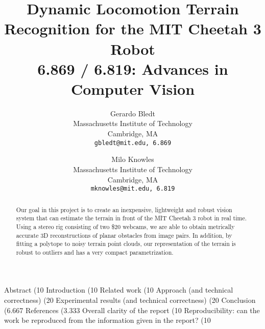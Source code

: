 \documentclass[10pt,twocolumn,letterpaper]{article}
\begin{document}
\title{Dynamic Locomotion Terrain Recognition for the MIT Cheetah 3 Robot \\ 6.869 / 6.819: Advances in Computer Vision}

\author{Gerardo Bledt\\
Massachusetts Institute of Technology\\
Cambridge, MA\\
{\tt\small gbledt@mit.edu, 6.869}
\and
Milo Knowles\\
Massachusetts Institute of Technology\\
Cambridge, MA\\
{\tt\small mknowles@mit.edu, 6.819}
}

\maketitle

\begin{abstract}
   Our goal in this project is to create an inexpensive, lightweight and robust vision system that can estimate the terrain in front of the MIT Cheetah 3 robot in real time. Using a stereo rig consisting of two \$20 webcams, we are able to obtain metrically accurate 3D reconstructions of planar obstacles from image pairs. In addition, by fitting a polytope to noisy terrain point clouds, our representation of the terrain is robust to outliers and has a very compact parametrization.
\end{abstract}












Abstract (10%
Introduction (10%
Related work (10%
Approach (and technical correctness) (20%
Experimental results (and technical correctness) (20%
Conclusion (6.667%
References (3.333%
Overall clarity of the report (10%
Reproducibility: can the work be reproduced from the information given in the report? (10%

{\small


}
\end{document}
